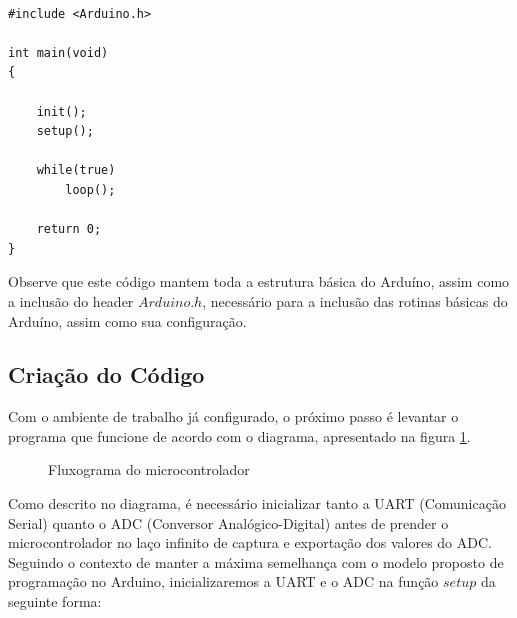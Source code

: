 \begin{multicols}{2}    %

\begin{lstlisting}[basicstyle=\ttfamily,numbers=none,caption={[Exemplo da função main()]Código de exemplo da função main()}]

#include <Arduino.h>

int main(void)
{

	init();
	setup();

	while(true) 
		loop();

	return 0;
}
\end{lstlisting}


Observe que este código mantem toda a estrutura básica do Arduíno, assim como a inclusão do header $Arduino.h$, necessário para a inclusão das rotinas básicas do Arduíno, assim como sua configuração.

\subsection{Criação do Código}\label{making_arduino}

Com o ambiente de trabalho já configurado, o próximo passo é levantar o programa que funcione de acordo com o diagrama, apresentado na figura \ref{flux_micro}.

\begin{figure}[H]
\begin{center}
\end{center}
\caption{Fluxograma do microcontrolador}
\label{flux_micro}
\end{figure}

Como descrito no diagrama, é necessário inicializar tanto a UART (Comunicação Serial) quanto o ADC (Conversor Analógico-Digital) antes de prender o microcontrolador no laço infinito de captura e exportação dos valores do ADC. Seguindo o contexto de manter a máxima semelhança com o modelo proposto de programação no Arduino, inicializaremos a UART e o ADC na função $setup$ da seguinte forma:


\end{multicols}
